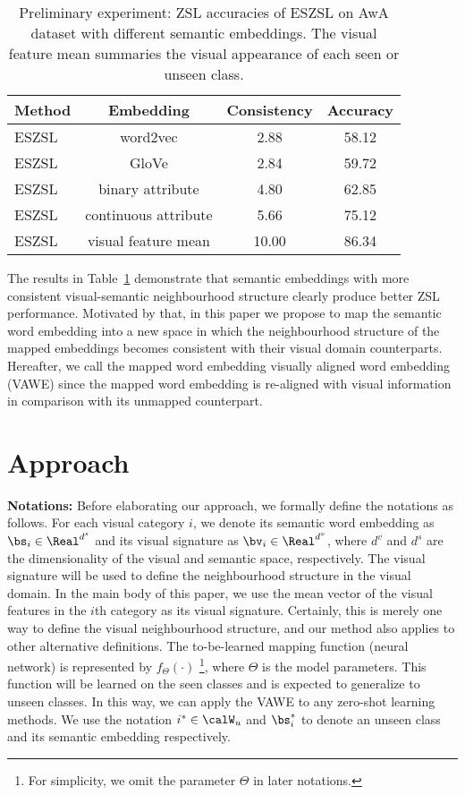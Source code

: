 \documentclass{bmvc2k}
\begin{document}
\begin{table}[ht]
\begin{center}
\begin{tabular}{|l|c|c|c|}
\hline
Method &Embedding &Consistency  &Accuracy\\
\hline\hline
ESZSL   &word2vec &2.88 &58.12 \\
ESZSL  &GloVe &2.84  &59.72\\
ESZSL  &binary attribute &4.80   &62.85\\
ESZSL  &continuous attribute &5.66   &75.12\\
ESZSL  &visual feature mean &10.00 &86.34 \\

\hline
\end{tabular}
\end{center}
\caption{Preliminary experiment: ZSL accuracies of ESZSL on AwA dataset with different semantic embeddings. The visual feature mean summaries the visual appearance of each seen or unseen class. }
\label{tab: pre_test}
\end{table}



The results in Table~\ref{tab: pre_test} demonstrate that semantic embeddings with more consistent visual-semantic neighbourhood structure clearly produce better ZSL performance. Motivated by that, in this paper we propose to map the semantic word embedding into a new space in which the neighbourhood structure of the mapped embeddings becomes consistent with their visual domain counterparts. Hereafter, we call the mapped word embedding visually aligned word embedding (VAWE) since the mapped word embedding is re-aligned with visual information in comparison with its unmapped counterpart.


\section{Approach}



%
%
{\bf Notations:} Before elaborating our approach, we formally define the notations as follows. For each visual category $i$, we denote its semantic word embedding as $\bs_i \in {\Real}^{d^s}$ and its visual signature as $\bv_i \in {\Real}^{d^v}$, where $d^v$ and $d^s$ are the dimensionality of the visual and semantic space, respectively. The visual signature will be used to define the neighbourhood structure in the visual domain. In the main body of this paper, we use the mean vector of the visual features in the $i$th category as its visual signature. Certainly, this is merely one way to define the visual neighbourhood structure, and our method also applies to other alternative definitions.
%
The to-be-learned mapping function (neural network) is represented by $f_\Theta(\cdot)$ \footnote{For simplicity, we omit the parameter $\Theta$ in later notations.}, where $\Theta$ is the model parameters. This function will be learned on the seen classes and is expected to generalize to unseen classes. In this way, we can apply the VAWE to any zero-shot learning methods. We use the notation $i^*\in \calW_u$ and $\bs_i^*$ to denote an unseen class and its semantic embedding respectively.
\end{document}
